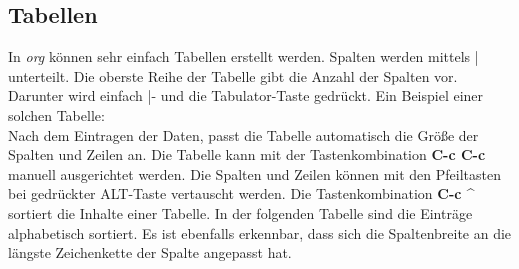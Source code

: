\subsection{Tabellen}
In \textit{org} können sehr einfach Tabellen erstellt werden. Spalten
werden mittels {\glqq}|{\grqq} unterteilt. Die oberste Reihe der
Tabelle gibt die Anzahl der Spalten vor. Darunter wird einfach
{\glqq}|-{\grqq} und die Tabulator-Taste gedrückt. Ein Beispiel einer
solchen Tabelle:\\



Nach dem Eintragen der Daten, passt die Tabelle automatisch die Größe
der Spalten und Zeilen an. Die Tabelle kann mit der Tastenkombination
\textbf{C-c C-c} manuell ausgerichtet werden. Die Spalten und Zeilen
können mit den Pfeiltasten bei gedrückter ALT-Taste vertauscht
werden. Die Tastenkombination \textbf{C-c \^} sortiert die Inhalte
einer Tabelle. In der folgenden Tabelle sind die Einträge alphabetisch
sortiert. Es ist ebenfalls erkennbar, dass sich die Spaltenbreite an
die längste Zeichenkette der Spalte angepasst hat.\\


